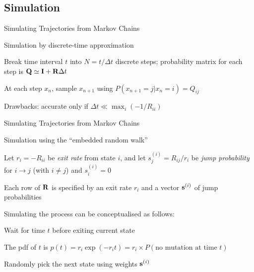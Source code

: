 \documentclass{beamer}
\begin{document}
\subsection{Simulation}

\begin{frame}{Simulating Trajectories from Markov Chains}

\itemb
\item Simulation by discrete-time approximation
 \itemb
 \item Break time interval $t$ into $N=t/\Delta t$ discrete steps; probability matrix for each step is ${\bf Q} \simeq {\bf I} + {\bf R} \Delta t$
 \item At each step $x_n$, sample $x_{n+1}$ using $P(x_{n+1}=j|x_n=i) = Q_{ij}$
\pause
 \item Drawbacks: accurate only if $\Delta t \ll \max_i (-1/R_{ii})$
 \iteme
\iteme

\end{frame}

\begin{frame}{Simulating Trajectories from Markov Chains}

\itemb
\item Simulation using the ``embedded random walk''
 \itemb
 \item Let $r_i=-R_{ii}$ be {\em exit rate} from state $i$, and let $s^{(i)}_j = R_{ij}/r_i$ be {\em jump probability} for $i \to j$ (with $i \neq j$) and $s^(i)_i = 0$
\pause
 \item Each row of ${\bf R}$ is specified by an exit rate $r_i$ and a vector ${\bf s}^{(i)}$ of jump probabilities
\pause
 \item Simulating the process can be conceptualised as follows:
  \itemb
  \item Wait for time $t$ before exiting current state
  \item The pdf of $t$ is $p(t) = r_i \exp(-r_i t) = r_i \times P(\mbox{no mutation at time $t$})$ %
  \item Randomly pick the next state using weights ${\bf s}^{(i)}$
  \iteme
 \iteme
\iteme

\end{frame}
\end{document}
